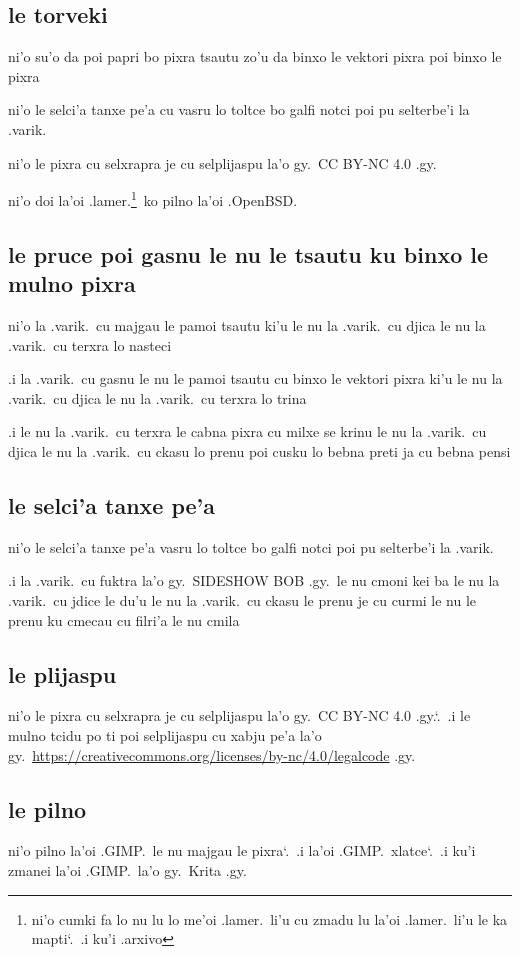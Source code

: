 \documentclass{report}
\newcommand\sds{\spacefactor\sfcode`.\ \space}
\begin{document}
\subsection{le torveki}
ni'o su'o da poi papri bo pixra tsautu zo'u da binxo le vektori pixra poi binxo le pixra

ni'o le selci'a tanxe pe'a cu vasru lo toltce bo galfi notci poi pu selterbe'i la .varik.

ni'o le pixra cu selxrapra je cu selplijaspu la'o gy.\ CC BY-NC 4.0 .gy.

ni'o doi la'oi .lamer.\footnote{ni'o cumki fa lo nu lu lo me'oi .lamer.\ li'u cu zmadu lu la'oi .lamer.\ li'u le ka mapti\sds  .i ku'i .arxivo}\ ko pilno la'oi .OpenBSD.

\subsection{le pruce poi gasnu le nu le tsautu ku binxo le mulno pixra}
ni'o la .varik.\ cu majgau le pamoi tsautu ki'u le nu la .varik.\ cu djica le nu la .varik.\ cu terxra lo nasteci

.i la .varik.\ cu gasnu le nu le pamoi tsautu cu binxo le vektori pixra ki'u le nu la .varik.\ cu djica le nu la .varik.\ cu terxra lo trina

.i le nu la .varik.\ cu terxra le cabna pixra cu milxe se krinu le nu la .varik.\ cu djica le nu la .varik.\ cu ckasu lo prenu poi cusku lo bebna preti ja cu bebna pensi

\subsection{le selci'a tanxe pe'a}
ni'o le selci'a tanxe pe'a vasru lo toltce bo galfi notci poi pu selterbe'i la .varik.

.i la .varik.\ cu fuktra la'o gy.\ SIDESHOW BOB .gy.\ le nu cmoni kei ba le nu la .varik.\ cu jdice le du'u le nu la .varik.\ cu ckasu le prenu je cu curmi le nu le prenu ku cmecau cu filri'a le nu cmila

\subsection{le plijaspu}
ni'o le pixra cu selxrapra je cu selplijaspu la'o gy.\ CC BY-NC 4.0 .gy.\sds  .i le mulno tcidu po ti poi selplijaspu cu xabju pe'a la'o gy.\ \url{https://creativecommons.org/licenses/by-nc/4.0/legalcode} .gy.

\subsection{le pilno}
ni'o pilno la'oi .GIMP.\ le nu majgau le pixra\sds  .i  la'oi .GIMP.\ xlatce\sds  .i ku'i zmanei la'oi .GIMP.\ la'o gy.\ Krita  .gy.
\end{document}
